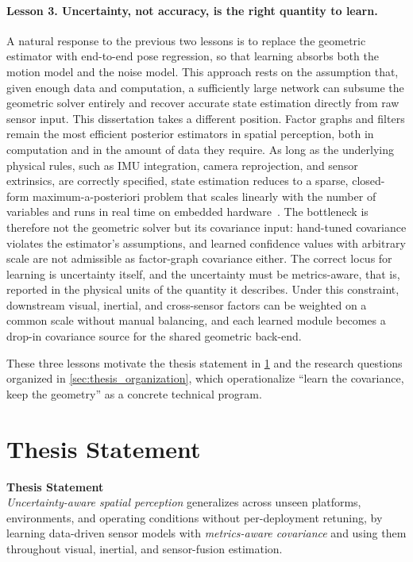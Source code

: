 \paragraph{Lesson 3. Uncertainty, not accuracy, is the right quantity to learn.}
A natural response to the previous two lessons is to replace the geometric estimator with end-to-end pose regression, so that learning absorbs both the motion model and the noise model.
This approach rests on the assumption that, given enough data and computation, a sufficiently large network can subsume the geometric solver entirely and recover accurate state estimation directly from raw sensor input.
This dissertation takes a different position.
Factor graphs and filters remain the most efficient posterior estimators in spatial perception, both in computation and in the amount of data they require.
As long as the underlying physical rules, such as IMU integration, camera reprojection, and sensor extrinsics, are correctly specified, state estimation reduces to a sparse, closed-form maximum-a-posteriori problem that scales linearly with the number of variables and runs in real time on embedded hardware~\cite{barfoot2017state, forster2015imu}.
The bottleneck is therefore not the geometric solver but its covariance input: hand-tuned covariance violates the estimator's assumptions, and learned confidence values with arbitrary scale are not admissible as factor-graph covariance either.
The correct locus for learning is uncertainty itself, and the uncertainty must be metrics-aware, that is, reported in the physical units of the quantity it describes.
Under this constraint, downstream visual, inertial, and cross-sensor factors can be weighted on a common scale without manual balancing, and each learned module becomes a drop-in covariance source for the shared geometric back-end.

These three lessons motivate the thesis statement in \cref{sec:thesis_statement} and the research questions organized in \cref{sec:thesis_organization}, which operationalize ``learn the covariance, keep the geometry'' as a concrete technical program.

\section{Thesis Statement}
\label{sec:thesis_statement}

\begin{framed}
    \centering
    \textbf{Thesis Statement} \\
    \textit{Uncertainty-aware spatial perception} generalizes across unseen platforms, environments, and operating conditions without per-deployment retuning, by learning data-driven sensor models with \textit{metrics-aware covariance} and using them throughout visual, inertial, and sensor-fusion estimation.
\end{framed}

